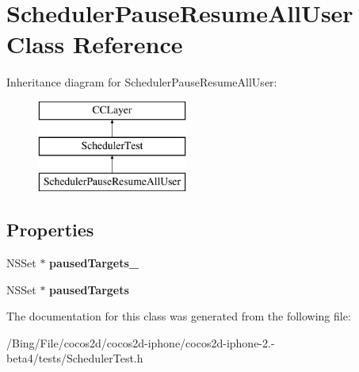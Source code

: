 \hypertarget{interface_scheduler_pause_resume_all_user}{\section{Scheduler\-Pause\-Resume\-All\-User Class Reference}
\label{interface_scheduler_pause_resume_all_user}
}
Inheritance diagram for Scheduler\-Pause\-Resume\-All\-User\-:\begin{figure}[H]
\begin{center}
\leavevmode
\includegraphics[height=3.000000cm]{interface_scheduler_pause_resume_all_user}
\end{center}
\end{figure}
\subsection*{Properties}
\begin{DoxyCompactItemize}
\item 
\hypertarget{interface_scheduler_pause_resume_all_user_aa3ca68f67bb1e708cd2e917e9f22836e}{N\-S\-Set $\ast$ {\bfseries paused\-Targets\-\_\-}}\label{interface_scheduler_pause_resume_all_user_aa3ca68f67bb1e708cd2e917e9f22836e}

\item 
\hypertarget{interface_scheduler_pause_resume_all_user_a1a8ed268225197a39b341bfefc272a4e}{N\-S\-Set $\ast$ {\bfseries paused\-Targets}}\label{interface_scheduler_pause_resume_all_user_a1a8ed268225197a39b341bfefc272a4e}

\end{DoxyCompactItemize}


The documentation for this class was generated from the following file\-:\begin{DoxyCompactItemize}
\item 
/\-Bing/\-File/cocos2d/cocos2d-\/iphone/cocos2d-\/iphone-\/2.-\/beta4/tests/Scheduler\-Test.\-h\end{DoxyCompactItemize}
